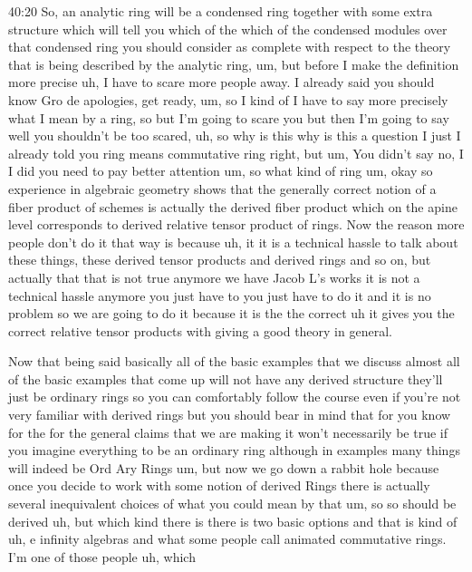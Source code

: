 \begin{unfinished}{40:20}
So, an analytic ring will be a condensed ring together with some extra structure which will tell you which of the which of the condensed modules over that condensed ring you should consider as complete with respect to the theory that is being described by the analytic ring, um, but before I make the definition more precise uh, I have to scare more people away. I already said you should know Gro de apologies, get ready, um, so I kind of I have to say more precisely what I mean by a ring, so but I'm going to scare you but then I'm going to say well you shouldn't be too scared, uh, so why is this why is this a question I just I already told you ring means commutative ring right, but um, You didn't say no, I I did you need to pay better attention um, so what kind of ring um, okay so experience in algebraic geometry shows that the generally correct notion of a fiber product of schemes is actually the derived fiber product which on the apine level corresponds to derived relative tensor product of rings. Now the reason more people don't do it that way is because uh, it it is a technical hassle to talk about these things, these derived tensor products and derived rings and so on, but actually that that is not true anymore we have Jacob L's works it is not a technical hassle anymore you just have to you just have to do it and it is no problem so we are going to do it because it is the the correct uh it gives you the correct relative tensor products with giving a good theory in general.

Now that being said basically all of the basic examples that we discuss almost all of the basic examples that come up will not have any derived structure they'll just be ordinary rings so you can comfortably follow the course even if you're not very familiar with derived rings but you should bear in mind that for you know for the for the general claims that we are making it won't necessarily be true if you imagine everything to be an ordinary ring although in examples many things will indeed be Ord Ary Rings um, but now we go down a rabbit hole because once you decide to work with some notion of derived Rings there is actually several inequivalent choices of what you could mean by that um, so so should be derived uh, but which kind there is there is two basic options and that is kind of uh, e infinity algebras and what some people call animated commutative rings. I'm one of those people uh, which


\end{unfinished}
